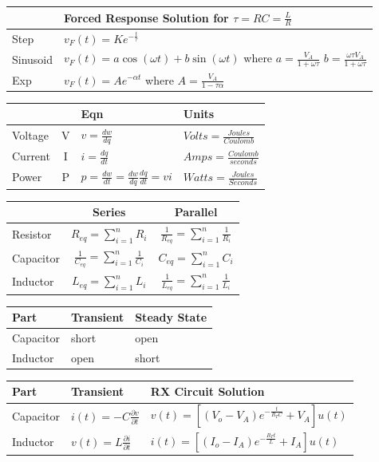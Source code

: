 \documentclass[10pt,landscape,twocolumn]{article}
\newcommand{\pd}[2]{\frac{\partial #1}{\partial #2}}
\begin{document}
\begin{tabular}{|l|l|}
	\hline
	           & Forced Response Solution for $\tau = RC = \frac{L}{R}$\\
	\hline
	Step       & $v_F(t)=Ke^{-\frac{t}{\tau}}$ \\
	Sinusoid   & $v_F(t)=a \cos(\omega t) + b \sin(\omega t)$ where $a=\frac{V_A}{1+\omega \tau}$ $b=\frac{\omega \tau V_A}{1+\omega \tau}$ \\
	Exp        & $v_F(t)=Ae^{-\alpha t}$ where $A=\frac{V_A}{1-\tau \alpha}$ \\
	\hline
\end{tabular}

\begin{tabular}{|l|c|l|l|}
	\hline
	        &   & Eqn & Units \\
	\hline
	Voltage & V & $v=\frac{dw}{dq}$ & $Volts = \frac{Joules}{Coulomb}$ \\
	Current & I & $i = \frac{dq}{dt}$ & $Amps = \frac{Coulomb}{seconds}$ \\
	Power   & P & $p = \frac{dw}{dt}=\frac{dw}{dq}\frac{dq}{dt}=v i$ & $Watts = \frac{Joules}{Seconds}$ \\
	\hline
\end{tabular}

\begin{tabular}{|l|c|c|}
	\hline
	         & Series & Parallel \\
	\hline
	Resistor  & $R_{eq} = \sum_{i=1}^n R_i$ & $\frac{1}{R_{eq}}=\sum_{i=1}^n \frac{1}{R_i}$ \\
	Capacitor & $\frac{1}{C_{eq}}=\sum_{i=1}^n \frac{1}{C_i}$ & $C_{eq} = \sum_{i=1}^n C_i$ \\
	Inductor  & $L_{eq} = \sum_{i=1}^n L_i$ & $\frac{1}{L_{eq}}=\sum_{i=1}^n \frac{1}{L_i}$ \\
	\hline
\end{tabular}

\begin{tabular}{|l|l|l|}
	\hline
	Part & Transient & Steady State \\
	\hline
	Capacitor  & short & open \\
	Inductor   & open & short \\
	\hline
\end{tabular}

\begin{tabular}{|l|l|l|}
	\hline
	Part & Transient & RX Circuit Solution \\
	\hline
	Capacitor & $i(t) = -C \pd{v}{t}$ & $v(t) = [ (V_o - V_A)e^{- \frac{t}{R_T C}}+V_A ] u(t)$ \\
	Inductor  & $v(t) = L \pd{i}{t}$  & $i(t) = [ (I_o - I_A)e^{- \frac{R_T t}{L}}+I_A ] u(t)$ \\
	\hline
\end{tabular}
\end{document}
